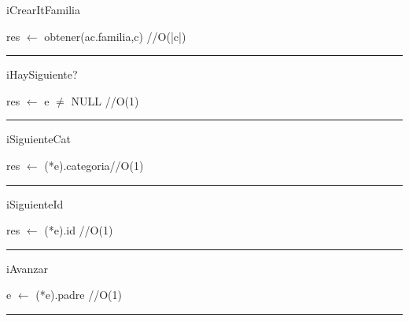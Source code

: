 \begin{algorithm}[H]
\caption{iCrearItFamilia}
\begin{algorithmic}[1]
\State res $\gets$ obtener(ac.familia,c) \hfill //O(|c|)
\EndFunction 
\end{algorithmic}
\hrule
{}
\end{algorithm}

\begin{algorithm}[H]
\caption{iHaySiguiente?}
\begin{algorithmic}[1]
\state res $\gets$ e $\neq$ NULL \hfill //O(1)
\EndFunction 
\end{algorithmic}
\hrule
{}
\end{algorithm}

\begin{algorithm}[H]
\caption{iSiguienteCat}
\begin{algorithmic}[1]
\state res $\gets$ (*e).categoria\hfill //O(1)
\EndFunction 
\end{algorithmic}
\hrule
{}
\end{algorithm}


\begin{algorithm}[H]
\caption{iSiguienteId}
\begin{algorithmic}[1]
\state res $\gets$ (*e).id \hfill //O(1)
\EndFunction 
\end{algorithmic}
\hrule
{}
\end{algorithm}

\begin{algorithm}[H]
\caption{iAvanzar}
\begin{algorithmic}[1]
\state e $\gets$ (*e).padre \hfill //O(1)
\EndFunction 
\end{algorithmic}
\hrule
{}
\end{algorithm}
